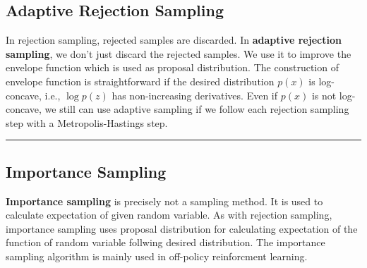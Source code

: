 \documentclass{article}
\begin{document}
    \subsection{Adaptive Rejection Sampling}
        In rejection sampling, rejected samples are discarded. In \textbf{adaptive rejection sampling}, we don't just discard the rejected samples.
        We use it to improve the envelope function which is used as proposal distribution. The construction of envelope function is straightforward
        if the desired distribution $p(x)$ is log-concave, i.e., $\log{p(z)}$ has non-increasing derivatives. Even if $p(x)$ is not log-concave, we still
        can use adaptive sampling if we follow each rejection sampling step with a Metropolis-Hastings step.

        \begin{algorithm}[H]
            \DontPrintSemicolon
            \caption{Adaptive rejection sampling algorithm}
            

            \BlankLine
            \hrule

        \end{algorithm}

    \subsection{Importance Sampling}
        \textbf{Importance sampling} is precisely not a sampling method. It is used to calculate expectation of given random
        variable. As with rejection sampling, importance sampling uses proposal distribution for calculating expectation of 
        the function of random variable follwing desired distribution. The importance sampling algorithm is mainly used in off-policy reinforcment learning.
\end{document}
